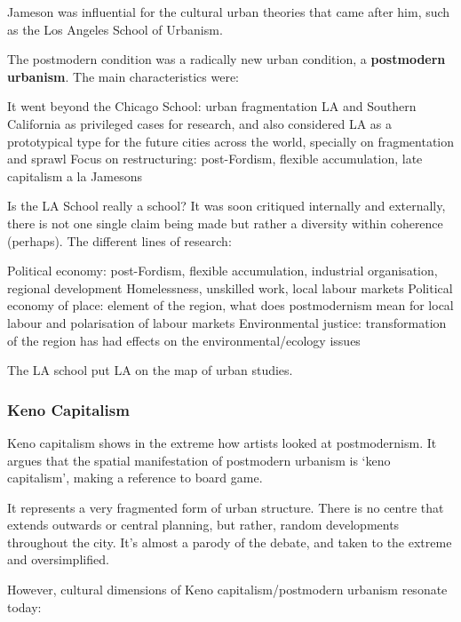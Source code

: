 \documentclass{article}
\begin{document}
Jameson was influential for the cultural urban theories that came after him, such as the Los Angeles School of Urbanism.

The postmodern condition was a radically new urban condition, a \textbf{postmodern urbanism}. The main characteristics were:

\begin{outline}
	\1 It went beyond the Chicago School: urban fragmentation
	\1 LA and Southern California as privileged cases for research, and also considered LA as a prototypical type for the future cities across the world, specially on fragmentation and sprawl
	\1 Focus on restructuring: post-Fordism, flexible accumulation, late capitalism a la Jamesons
\end{outline}

Is the LA School really a school? It was soon critiqued internally and externally, there is not one single claim being made but rather a diversity within coherence (perhaps). The different lines of research:

\begin{outline}
	\1 Political economy: post-Fordism, flexible accumulation, industrial organisation, regional development
	\1 Homelessness, unskilled work, local labour markets
	\1 Political economy of place: element of the region, what does postmodernism mean for local labour and polarisation of labour markets
	\1 Environmental justice: transformation of the region has had effects on the environmental/ecology issues
\end{outline}

The LA school put LA on the map of urban studies. 

\subsubsection{Keno Capitalism}

Keno capitalism shows in the extreme how artists looked at postmodernism. It argues that the spatial manifestation of postmodern urbanism is `keno capitalism', making a reference to board game.

It represents a very fragmented form of urban structure. There is no centre that extends outwards or central planning, but rather, random developments throughout the city. It's almost a parody of the debate, and taken to the extreme and oversimplified.

However, cultural dimensions of Keno capitalism/postmodern urbanism resonate today:
\end{document}
